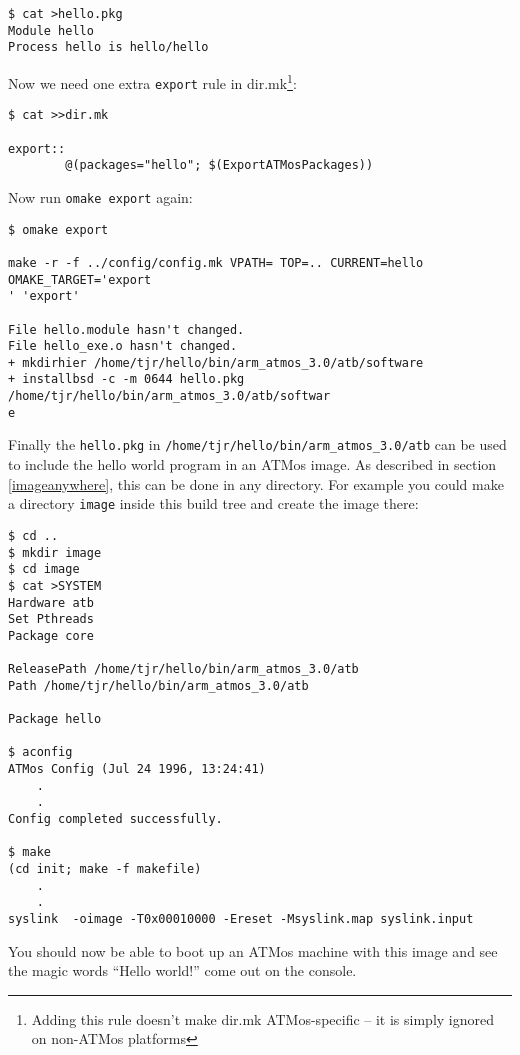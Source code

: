 \documentclass[11pt,twoside,onecolumn]{article}
\begin{document}
{\small \begin{verbatim}
$ cat >hello.pkg
Module hello
Process hello is hello/hello
\end{verbatim}}

Now we need one extra {\tt export} rule in dir.mk\footnote{Adding this rule
doesn't make dir.mk ATMos-specific -- it is simply ignored on non-ATMos
platforms}:

{\small \begin{verbatim}
$ cat >>dir.mk

export::
        @(packages="hello"; $(ExportATMosPackages))
\end{verbatim}}

Now run {\tt omake export} again:

{\small \begin{verbatim}
$ omake export

make -r -f ../config/config.mk VPATH= TOP=.. CURRENT=hello OMAKE_TARGET='export
' 'export'

File hello.module hasn't changed.
File hello_exe.o hasn't changed.
+ mkdirhier /home/tjr/hello/bin/arm_atmos_3.0/atb/software 
+ installbsd -c -m 0644 hello.pkg /home/tjr/hello/bin/arm_atmos_3.0/atb/softwar
e 
\end{verbatim}}

Finally the {\tt hello.pkg} in \verb|/home/tjr/hello/bin/arm_atmos_3.0/atb| can
be used to include the hello world program in an ATMos image.  As described in
section \ref{imageanywhere}, this can be done in any directory.  For example
you could make a directory {\tt image} inside this build tree and create the
image there:

{\small \begin{verbatim}
$ cd ..
$ mkdir image
$ cd image
$ cat >SYSTEM
Hardware atb
Set Pthreads
Package core

ReleasePath /home/tjr/hello/bin/arm_atmos_3.0/atb
Path /home/tjr/hello/bin/arm_atmos_3.0/atb

Package hello

$ aconfig
ATMos Config (Jul 24 1996, 13:24:41)
    .
    .
Config completed successfully.

$ make
(cd init; make -f makefile)
    .
    .
syslink  -oimage -T0x00010000 -Ereset -Msyslink.map syslink.input

\end{verbatim}}

You should now be able to boot up an ATMos machine with this image and see the
magic words ``Hello world!'' come out on the console.
\end{document}
